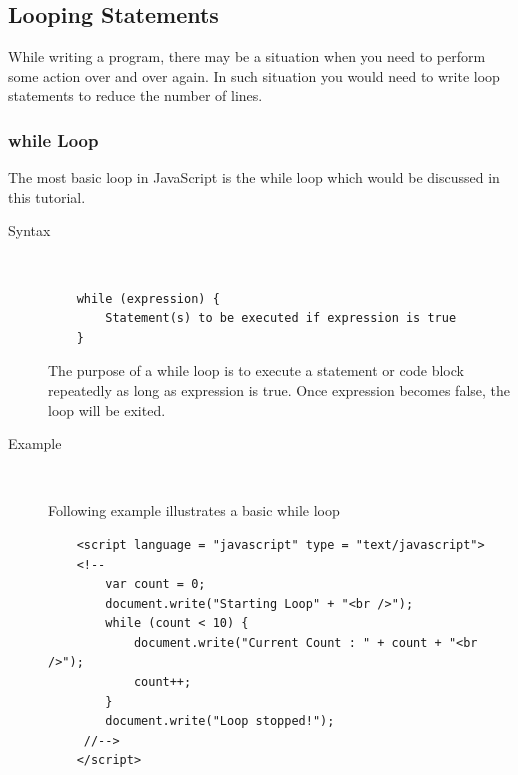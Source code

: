\documentclass[11pt,a4paper]{article}
\begin{document}
\subsection*{Looping Statements}

While writing a program, there may be a situation when you need to perform some action over and over again. In such situation you would need to write loop statements to reduce the number of lines.

\subsubsection*{while Loop}
The most basic loop in JavaScript is the while loop which would be discussed in this tutorial.
\begin{description}
\item[Syntax]\

\begin{verbatim}
    while (expression) { 
        Statement(s) to be executed if expression is true
    }
\end{verbatim}

The purpose of a while loop is to execute a statement or code block repeatedly as long as expression is true. Once expression becomes false, the loop will be exited.
\item[Example]\

Following example illustrates a basic while loop

\begin{verbatim}
    <script language = "javascript" type = "text/javascript">
    <!--
        var count = 0;
        document.write("Starting Loop" + "<br />");
        while (count < 10) {
            document.write("Current Count : " + count + "<br />");
            count++;
        }
        document.write("Loop stopped!");
     //-->
    </script>
\end{verbatim}
\end{description}
\end{document}
